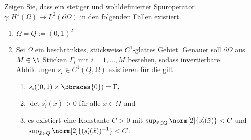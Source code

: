 
\begin{exercise}

Zeigen Sie, dass ein stetiger und wohldefinierter Spuroperator $\gamma: H^1(\Omega) \rightarrow L^2(\partial \Omega)$ in den folgenden Fällen existiert.

\begin{enumerate}[label = \textbf{\alph*)}]

  \item $\Omega = Q := (0, 1)^2$

  \item Sei $\Omega$ ein beschränktes, stückweise $C^1$-glattes Gebiet.
  Genauer soll $\partial \Omega$ aus $M \in \N$ Stücken $\Gamma_i$ mit $i = 1, \dots, M$ bestehen, sodass invertierbare Abbildungen $s_i \in C^1(Q,\Omega)$ existieren für die gilt

  \begin{enumerate}[label = (\alph*)]

    \item $s_i((0, 1) \times \Bbraces{0}) = \Gamma_i$

    \item $\det s_i^\prime (\tilde{x}) > 0$ für alle $\tilde{x} \in \Omega$ und

    \item es existiert eine Konstante $C > 0$ mit $\sup_{\tilde{x} \in Q}\norm[2]{s_i^\prime (\tilde{x})} < C$ und $\sup_{\tilde{x} \in Q}\norm[2]{(s_i^\prime (\tilde{x}))^{-1}} < C$.

  \end{enumerate}

\end{enumerate}

\end{exercise}


